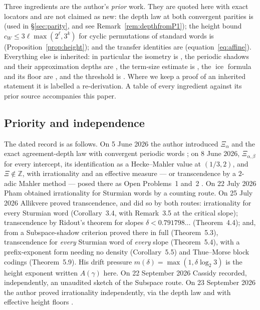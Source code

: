 \documentclass[11pt,reqno]{amsart}
\theoremstyle{plain}
\theoremstyle{definition}
\DeclareMathOperator{\ice}{ice}
\newcommand{\Z}{\mathbb{Z}}
\newcommand{\Av}{A(\gamma)}
\begin{document}
Three ingredients are the author's \emph{prior} work. They are quoted here with exact locators and
are not claimed as new: the depth law at both convergent parities is \cite[Theorem 8.3]{DJirr}
(used in \S\ref{sec:parity}, and see Remark~\ref{rem:depthfromP1}); the height bound
$c_W\le3\ell\max(2^{\ell},3^{k})$ for cyclic permutations of standard words is
\cite[Lemma 10.4]{DJirr} (Proposition~\ref{prop:height}); and the transfer identities are
\cite[Corollaries 7.1 and 8.8]{DJirr} (equation~\eqref{eq:affine}). Everything else is inherited:
in particular the isometry is \cite{BL96}, the periodic shadows and their approximation depths are
\cite[Theorem 1]{LS09}, the term-size estimate is \cite[Lemma 43, \S11]{LS21}, the $\ice$ formula
and its floor are \cite[\S4.2]{BHZ06}, and the threshold is \cite[Theorem 1.3]{BK18}. Where we
keep a proof of an inherited statement it is labelled a re-derivation. A table of every ingredient
against its prior source accompanies this paper.

\subsection{Priority and independence}\label{ss:priority}
The dated record is as follows. On 5 June 2026 the author introduced $\Xi_\alpha$ and the exact
agreement-depth law with convergent periodic words \cite[Lemma 5.1, Theorem 7.1]{DJcarry}; on
8 June 2026, $\Xi_{\alpha,\beta}$ for every intercept, its identification as a Hecke--Mahler value
at $(1/3,2)$, and $\Xi\notin\Z$, with irrationality and an effective measure --- or transcendence
by a $2$-adic Mahler method --- posed there as Open Problems~1 and~2 \cite{DJedge}. On 22 July 2026
Pham \cite{Pham26} obtained irrationality for Sturmian words by a counting route. On 25 July 2026
Allikvere \cite{Allikvere26} proved transcendence, and did so by both routes: irrationality for
every Sturmian word (Corollary~3.4, with Remark~3.5 at the critical slope); transcendence by
Ridout's theorem for slopes $\delta<0.791798\ldots$ (Theorem~4.4); and, from a Subspace-shadow
criterion proved there in full (Theorem~5.3), transcendence for \emph{every} Sturmian word of
\emph{every} slope (Theorem~5.4), with a prefix-exponent form needing no density (Corollary~5.5)
and Thue--Morse block codings (Theorem~5.9). His drift pressure $m(\delta)=\max(1,\delta\log_2 3)$
is the height exponent written $\Av$ here. On 22 September 2026 Cassidy \cite[\S4.6]{Cassidy26}
recorded, independently, an unaudited sketch of the Subspace route. On 23 September 2026 the author
proved irrationality independently, via the depth law and with effective height floors
\cite{DJirr}.
\end{document}
